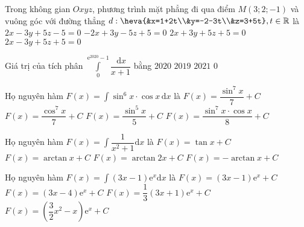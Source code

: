 \begin{ex}%
Trong không gian $O x y z$, phương trình mặt phẳng đi qua điểm $M(3 ; 2 ;-1)$ và vuông góc với đường thẳng $d:\heva{&x=1+2t\\&y=-2-3t\\&z=3+5t},t\in\mathbb{R}$ là
\choice
{$2 x-3 y+5 z-5=0$}
{$-2 x+3 y-5 z+5=0$}
{$2 x+3 y+5 z+5=0$}
{\True $2 x-3 y+5 z+5=0$}
\end{ex}

\begin{ex}%
Giá trị của tích phân $\displaystyle\int\limits_{0}^{\mathrm{e}^{2020}-1} \dfrac{\mathrm{\,d}x}{x+1}$ bằng
\choice
{\True$2020$}
{$2019$}
{$2021$}
{$0$}
\end{ex}

\begin{ex}%
Họ nguyên hàm $F(x)=\displaystyle\int\sin^{6}x\cdot\cos x\mathrm{\,d}x$ là
\choice
{\True $F(x)=\dfrac{\sin^{7}x}{7}+C$}
{$F(x)=\dfrac{\cos^{7}x}{7}+C$}
{$F(x)=\dfrac{\sin^{5}x}{5}+C$}
{$F(x)=\dfrac{\sin^{7}x\cdot\cos x}{8}+C$}
\end{ex}

\begin{ex}%
Họ nguyên hàm $F(x)=\displaystyle\int\dfrac{1}{x^2+1}\mathrm{d}x$ là
\choice
{$F(x)=\tan x+C$}
{\True $F(x)=\arctan x+C$}
{$F(x)=\arctan2x+C$}
{$F(x)=-\arctan x+C$}
\end{ex}

\begin{ex}%
Họ nguyên hàm $F(x)=\displaystyle\int(3x-1)\mathrm{e}^x\mathrm{d}x$ là
\choice
{$F(x)=(3x-1)\mathrm{e}^x+C$}
{\True $F(x)=(3x-4)\mathrm{e}^x+C$}
{$F(x)=\dfrac{1}{3}(3x+1)\mathrm{e}^x+C$}
{$F(x)=\left(\dfrac{3}{2}x^2-x\right)\mathrm{e}^x+C$}
\end{ex}

